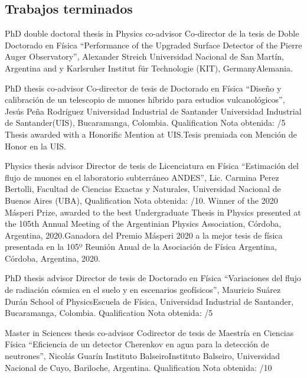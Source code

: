 \subsection*{Trabajos terminados}
\fi

\ifeng
PhD double doctoral thesis in Physics co-advisor
\else
Co-director de la tesis de Doble Doctorado en Física
\fi
``Performance of the Upgraded Surface Detector of the Pierre Auger Observatory'', Alexander Streich \at Universidad Nacional de San Martín, Argentina \ifeng and \else y \fi Karlsruher Institut für Technologie (KIT), \ifeng Germany\else Alemania\fi.

\ifeng
PhD thesis co-advisor
 \else
Co-director de tesis de Doctorado en Física
 \fi
``Diseño y calibración de un telescopio de muones híbrido para estudios vulcanológicos'', Jesús Peña Rodríguez \at \ifeng Universidad Industrial de Santander \else Universidad Industrial de Santander\fi (UIS), Bucaramanga, Colombia. \ifeng Qualification \else Nota obtenida: /5 \ifeng Thesis awarded with a Honorific Mention at UIS.\else Tesis premiada con Mención de Honor en la UIS.\fi

\ifeng
Physics thesis advisor
 \else
Director de tesis de Licenciatura en Física
 \fi
``Estimación del flujo de muones en el laboratorio subterráneo ANDES'', Lic.
Carmina Perez Bertolli, \at Facultad de Ciencias Exactas y Naturales, Universidad Nacional de Buenos Aires (UBA), \ifeng Qualification \else Nota obtenida: /10. \ifeng Winner of the 2020 Másperi Prize, awarded to the best Undergraduate Thesis in Physics presented at the 105th Annual Meeting of the Argentinian Physics Association, Córdoba, Argentina, 2020.\else Ganadora del Premio Másperi 2020 a la mejor tesis de física presentada en la 105º Reunión Anual de la Asociación de Física Argentina, Córdoba, Argentina, 2020. \fi

\ifeng
PhD thesis advisor
 \else
Director de tesis de Doctorado en Física
 \fi
``Variaciones del flujo de radiación cósmica en el suelo y en escenarios geofísicos'', Mauricio Suárez Durán \at \ifeng School of Physics\else Escuela de Física\fi, Universidad Industrial de Santander, Bucaramanga, Colombia. \ifeng Qualification \else Nota obtenida: /5

\ifeng
Master in Sciences thesis co-advisor
 \else
Codirector de tesis de Maestría en Ciencias Física
 \fi
``Eficiencia de un detector Cherenkov en agua para la detección de neutrones'', Nicolás Guarín \at \ifeng Instituto Balseiro\else Instituto Balseiro\fi, Universidad Nacional de Cuyo, Bariloche, Argentina. \ifeng Qualification \else Nota obtenida: /10

